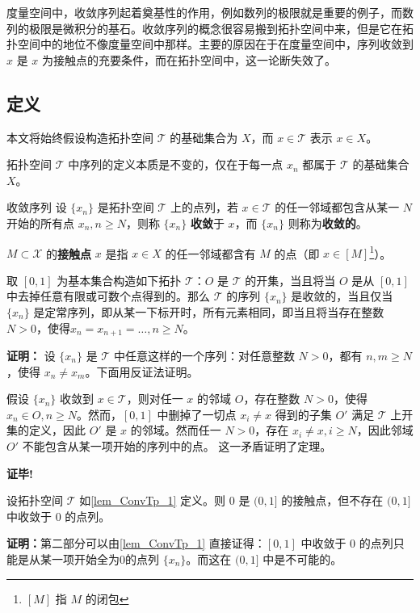 

度量空间中，收敛序列起着奠基性的作用，例如数列的极限就是重要的例子，而数列的极限是微积分的基石。收敛序列的概念很容易搬到拓扑空间中来，但是它在拓扑空间中的地位不像度量空间中那样。主要的原因在于在度量空间中，序列收敛到 $x$ 是 $x$ 为接触点的充要条件，而在拓扑空间中，这一论断失效了。

\subsection{定义}
本文将始终假设构造拓扑空间 $\mathcal T$ 的基础集合为 $X$，而 $x\in\mathcal T$ 表示 $x\in X$。

拓扑空间 $\mathcal T$ 中序列的定义本质是不变的，仅在于每一点 $x_n$ 都属于 $\mathcal T$ 的基础集合 $X$。
\begin{definition}{收敛序列}
设 $\{x_n\}$ 是拓扑空间 $\mathcal T$ 上的点列，若 $x\in\mathcal T$ 的任一邻域都包含从某一 $N$ 开始的所有点 $x_n,n\geq N$，则称 $\{x_n\}$ \textbf{收敛}于 $x$，而 $\{x_n\}$ 则称为\textbf{收敛的}。
\end{definition}

 $M\subset\mathcal X$ 的\textbf{接触点} $x$ 是指 $x\in X$ 的任一邻域都含有 $M$ 的点（即 $x\in[M]$\footnote{$[M]$ 指 $M$ 的闭包}）。
 
 \begin{lemma}{}\label{lem_ConvTp_1}
 取 $[0,1]$ 为基本集合构造如下拓扑 $\mathcal T$：$O$ 是 $\mathcal T$ 的开集，当且将当 $O$ 是从 $[0,1]$ 中去掉任意有限或可数个点得到的。那么 $\mathcal T$ 的序列 $\{x_n\}$ 是收敛的，当且仅当 $\{x_n\}$ 是定常序列，即从某一下标开时，所有元素相同，即当且将当存在整数 $N>0$，使得$x_n=x_{n+1}=\ldots,n\geq N$。
 \end{lemma}
 \textbf{证明：}
设 $\{x_n\}$ 是 $\mathcal T$ 中任意这样的一个序列：对任意整数 $N>0$，都有 $n,m\geq N$，使得 $x_n\neq x_m$。下面用反证法证明。 

假设 $\{x_n\}$ 收敛到 $x\in\mathcal T$，则对任一 $x$ 的邻域 $O$，存在整数 $N>0$，使得 $x_n\in O,n\geq N$。然而，$[0,1]$ 中删掉了一切点 $x_i\neq x$ 得到的子集 $O'$ 满足 $\mathcal T$ 上开集的定义，因此 $O'$ 是 $x$ 的邻域。然而任一 $N>0$，存在 $x_i\neq x,i\geq N$，因此邻域 $O'$ 不能包含从某一项开始的序列中的点。  这一矛盾证明了定理。

 \textbf{证毕!}

\begin{corollary}{}\label{cor_ConvTp_1}
设拓扑空间 $\mathcal T$ 如\autoref{lem_ConvTp_1} 定义。则 $0$ 是 $(0,1]$ 的接触点，但不存在 $(0,1]$ 中收敛于 $0$ 的点列。
\end{corollary}
\textbf{证明：}第二部分可以由\autoref{lem_ConvTp_1} 直接证得：$[0,1]$ 中收敛于 $0$ 的点列只能是从某一项开始全为0的点列 $\{x_n\}$。而这在 $(0,1]$ 中是不可能的。

